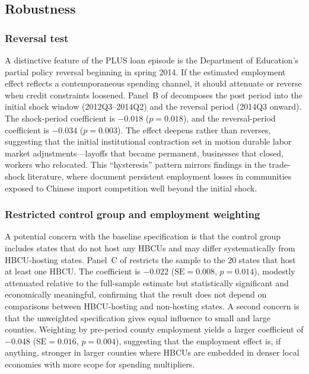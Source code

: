 \documentclass[12pt]{article}
\begin{document}


\subsection{Robustness}

\subsubsection*{Reversal test} A distinctive feature of the PLUS loan episode is the Department of Education's partial policy reversal beginning in spring 2014. If the estimated employment effect reflects a contemporaneous spending channel, it should attenuate or reverse when credit constraints loosened. Panel~B of  decomposes the post period into the initial shock window (2012Q3--2014Q2) and the reversal period (2014Q3 onward). The shock-period coefficient is $-0.018$ ($p = 0.018$), and the reversal-period coefficient is $-0.034$ ($p = 0.003$). The effect deepens rather than reverses, suggesting that the initial institutional contraction set in motion durable labor market adjustments---layoffs that became permanent, businesses that closed, workers who relocated. This ``hysteresis'' pattern mirrors findings in the trade-shock literature, where \citet{autor2013} document persistent employment losses in communities exposed to Chinese import competition well beyond the initial shock.

\subsubsection*{Restricted control group and employment weighting} A potential concern with the baseline specification is that the control group includes states that do not host any HBCUs and may differ systematically from HBCU-hosting states. Panel~C of  restricts the sample to the 20 states that host at least one HBCU. The coefficient is $-0.022$ ($\text{SE} = 0.008$, $p = 0.014$), modestly attenuated relative to the full-sample estimate but statistically significant and economically meaningful, confirming that the result does not depend on comparisons between HBCU-hosting and non-hosting states. A second concern is that the unweighted specification gives equal influence to small and large counties. Weighting by pre-period county employment yields a larger coefficient of $-0.048$ ($\text{SE} = 0.016$, $p = 0.004$), suggesting that the employment effect is, if anything, stronger in larger counties where HBCUs are embedded in denser local economies with more scope for spending multipliers.
\end{document}
